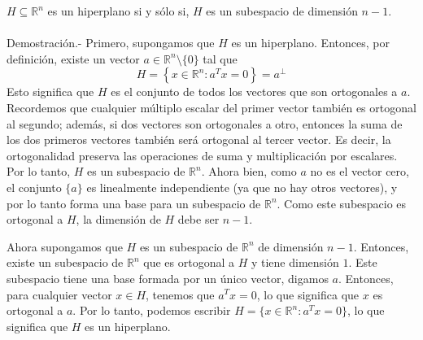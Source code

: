\begin{paracol}{2}
{\color{blue}
\begin{proposicion}
    $H\subseteq \mathbb{R}^n$ es un hiperplano si y sólo si, $H$ es un subespacio de dimensión $n-1$.\\\\
	Demostración.-\; Primero, supongamos que $H$ es un hiperplano. Entonces, por definición, existe un vector $a \in \mathbb{R}^n \setminus \{0\}$ tal que 
	$$H = \left\{x \in \mathbb{R}^n : a^T x = 0\right\}=a^{\perp}$$ 
	Esto significa que $H$ es el conjunto de todos los vectores que son ortogonales a $a$. Recordemos que cualquier múltiplo escalar del primer vector también es ortogonal al segundo; además, si dos vectores son ortogonales a otro, entonces la suma de los dos primeros vectores también será ortogonal al tercer vector. Es decir, la ortogonalidad preserva las operaciones de suma y multiplicación por escalares. Por lo tanto, $H$ es un subespacio de $\mathbb{R}^n$. Ahora bien, como $a$ no es el vector cero, el conjunto $\{a\}$ es linealmente independiente (ya que no hay otros vectores), y por lo tanto forma una base para un subespacio de $\mathbb{R}^n$. Como este subespacio es ortogonal a $H$, la dimensión de $H$ debe ser $n - 1$.

	Ahora supongamos que $H$ es un subespacio de $\mathbb{R}^n$ de dimensión $n - 1$. Entonces, existe un subespacio de $\mathbb{R}^n$ que es ortogonal a $H$ y tiene dimensión $1$. Este subespacio tiene una base formada por un único vector, digamos $a$. Entonces, para cualquier vector $x \in H$, tenemos que $a^T x = 0$, lo que significa que $x$ es ortogonal a $a$. Por lo tanto, podemos escribir $H = \{x \in \mathbb{R}^n : a^T x = 0\}$, lo que significa que $H$ es un hiperplano.
\end{proposicion}
}


\end{paracol}
